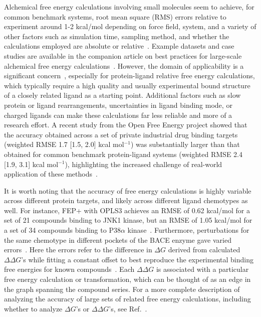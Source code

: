 \documentclass[9pt,bestpractices]{livecoms}
\begin{document}
Alchemical free energy calculations involving small molecules seem to achieve, for common benchmark systems, root mean square (RMS) errors relative to experiment around 1-2 kcal/mol depending on force field, system, and a variety of other factors such as simulation time, sampling method, and whether the calculations employed are absolute or relative~\cite{baumann2025largescale, fuMetaAnalysisRevealsThat2022}. Example datasets and case studies are available in the companion article on best practices for large-scale alchemical free energy calculations~\cite{mey_largescale_inprep}.
However, the domain of applicability is a significant concern~\cite{sherborne2016collaborating, cournia2017relative, baumann2025largescale}, especially for protein-ligand relative free energy calculations, which typically require a high quality and usually experimental bound structure of a closely
related ligand as a starting point. Additional factors such as slow protein or ligand rearrangements, uncertainties in ligand binding mode, or charged ligands can make these calculations far less reliable and more of a research effort. A recent study from the Open Free Energy project showed that the accuracy obtained across a set of private industrial drug binding targets (weighted RMSE 1.7 [1.5, 2.0] kcal mol$^{-1}$) was substantially larger than that obtained for common benchmark protein-ligand systems (weighted RMSE 2.4 [1.9, 3.1] kcal mol$^{-1}$), highlighting the increased challenge of real-world application of these methods~\cite{baumann2025largescale}.

It is worth noting that the accuracy of free energy calculations is highly variable across different protein targets, and likely across different ligand chemotypes as well.
For instance, FEP+ with OPLS3 achieves an RMSE of 0.62 kcal/mol for a set of 21 compounds binding to JNK1 kinase, but an RMSE of 1.05 kcal/mol for a set of 34 compounds binding to P38$\alpha$ kinase~\cite{harder2016opls3}.
Furthermore, perturbations for the same chemotype in different pockets of the BACE enzyme gave varied errors~\cite{keranen2017acylguanidine}. Here the errors refer to the difference in $\Delta G$ derived from calculated $\Delta \Delta G$'s while fitting a constant offset to best reproduce the experimental binding free energies for known compounds~\cite{wang2015accurate}. Each $\Delta \Delta G$ is associated with a particular free energy calculation or transformation, which can be thought of as an edge in the graph spanning the compound series.  For a more complete description of analyzing the accuracy of large sets of related free energy calculations, including whether to analyze $\Delta G$'s or $\Delta \Delta G$'s, see Ref.~\cite{mey_largescale_inprep}.
\end{document}

